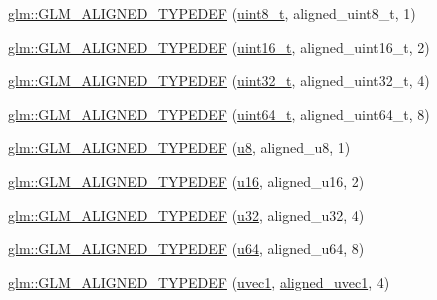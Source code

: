 \begin{DoxyCompactItemize}
\item 
\hyperlink{group__gtx__type__aligned_gaf6ced36f13bae57f377bafa6f5fcc299}{glm\+::\+G\+L\+M\+\_\+\+A\+L\+I\+G\+N\+E\+D\+\_\+\+T\+Y\+P\+E\+D\+EF} (\hyperlink{group__gtc__type__precision_ga93adf6dd9803408f3e3aaf9dedda352b}{uint8\+\_\+t}, aligned\+\_\+uint8\+\_\+t, 1)
\item 
\hyperlink{group__gtx__type__aligned_gafbc7fb7847bfc78a339d1d371c915c73}{glm\+::\+G\+L\+M\+\_\+\+A\+L\+I\+G\+N\+E\+D\+\_\+\+T\+Y\+P\+E\+D\+EF} (\hyperlink{group__gtc__type__precision_gac4eb4f43cae8129b00086dc234d3b8fc}{uint16\+\_\+t}, aligned\+\_\+uint16\+\_\+t, 2)
\item 
\hyperlink{group__gtx__type__aligned_gaa86bc56a73fd8120b1121b5f5e6245ae}{glm\+::\+G\+L\+M\+\_\+\+A\+L\+I\+G\+N\+E\+D\+\_\+\+T\+Y\+P\+E\+D\+EF} (\hyperlink{group__gtc__type__precision_ga822ca53a9ad412504532838906276a99}{uint32\+\_\+t}, aligned\+\_\+uint32\+\_\+t, 4)
\item 
\hyperlink{group__gtx__type__aligned_ga68c0b9e669060d0eb5ab8c3ddeb483d8}{glm\+::\+G\+L\+M\+\_\+\+A\+L\+I\+G\+N\+E\+D\+\_\+\+T\+Y\+P\+E\+D\+EF} (\hyperlink{group__gtc__type__precision_ga058f57c19e1befdcf12498944bd73e69}{uint64\+\_\+t}, aligned\+\_\+uint64\+\_\+t, 8)
\item 
\hyperlink{group__gtx__type__aligned_ga4f3bab577daf3343e99cc005134bce86}{glm\+::\+G\+L\+M\+\_\+\+A\+L\+I\+G\+N\+E\+D\+\_\+\+T\+Y\+P\+E\+D\+EF} (\hyperlink{group__gtc__type__precision_ga5e3dc67373d5068997d2d9f41c9024d2}{u8}, aligned\+\_\+u8, 1)
\item 
\hyperlink{group__gtx__type__aligned_ga13a2391339d0790d43b76d00a7611c4f}{glm\+::\+G\+L\+M\+\_\+\+A\+L\+I\+G\+N\+E\+D\+\_\+\+T\+Y\+P\+E\+D\+EF} (\hyperlink{group__gtc__type__precision_gae7a1571503f83d2264ddfa705a6b082a}{u16}, aligned\+\_\+u16, 2)
\item 
\hyperlink{group__gtx__type__aligned_ga197570e03acbc3d18ab698e342971e8f}{glm\+::\+G\+L\+M\+\_\+\+A\+L\+I\+G\+N\+E\+D\+\_\+\+T\+Y\+P\+E\+D\+EF} (\hyperlink{group__gtc__type__precision_ga54e837745059fd29017bed71cfa0a8db}{u32}, aligned\+\_\+u32, 4)
\item 
\hyperlink{group__gtx__type__aligned_ga0f033b21e145a1faa32c62ede5878993}{glm\+::\+G\+L\+M\+\_\+\+A\+L\+I\+G\+N\+E\+D\+\_\+\+T\+Y\+P\+E\+D\+EF} (\hyperlink{group__gtc__type__precision_ga71cedd4972f9cb1a5e14dfe5ab83ecd7}{u64}, aligned\+\_\+u64, 8)
\item 
\hyperlink{group__gtx__type__aligned_ga509af83527f5cd512e9a7873590663aa}{glm\+::\+G\+L\+M\+\_\+\+A\+L\+I\+G\+N\+E\+D\+\_\+\+T\+Y\+P\+E\+D\+EF} (\hyperlink{group__ext__vec1_ga4e12bc23a3d060164eef452f81d92a03}{uvec1}, \hyperlink{group__gtc__type__aligned_gab0fbe9830a7129d9135b558b30eed930}{aligned\+\_\+uvec1}, 4)

\end{DoxyCompactItemize}
